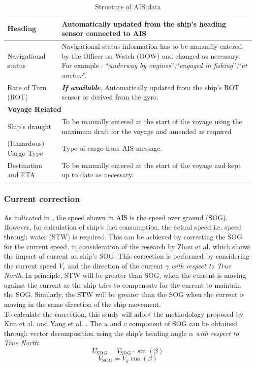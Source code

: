 \begin{table}
{\begin{tabular}{ |p{6cm}|p{9cm}|  }
    \hline
    Heading & Automatically updated from the ship's heading sensor connected to AIS\\
    \hline
    Navigational status & Navigational status information has to be manually entered by the Officer on Watch (OOW) and changed as necessary. For example : ``\emph{underway by engines}'',``\emph{engaged in fishing}'',``\emph{at anchor}''.\\
    \hline
    Rate of Turn (ROT) & \emph{\textbf{If available}}, Automatically updated from the ship's ROT sensor or derived from
    the gyro.\\
    \hline
    \multicolumn{2}{|l|}{\textbf{Voyage Related}}\\
    \hline
    Ship's draught & To be manually entered at the start of the voyage using the
    maximum draft for the voyage and amended as required \\
    \hline 
    (Hazardous) Cargo Type & Type of cargo from AIS message.\\
    \hline
    Destination and ETA & To be manually entered at the start of the voyage and kept up to
    date as necessary.\\
    \hline
    \end{tabular}}
\caption{Structure of AIS data \cite{webimo.2014}}\label{AIS_struct}
\end{table}

\subsubsection{Current correction}\label{curr_corr}

As indicated in , the speed shown in AIS is the speed over ground (SOG). However, for calculation of ship's fuel consumption, the actual speed i.e. speed through water (STW) is required. This can be achieved by correcting the SOG for the current speed, in consideration of the research by Zhou et al. \cite{Zhou.2017} which shows the impact of current on ship's SOG. This correction is performed by considering the current speed $V_c$ and the direction of the current $\gamma$ \emph{with respect to True North}. In principle, STW will be greater than SOG, when the current is moving against the current as the ship tries to compensate for the current to maintain the SOG. Similarly, the STW will be greater than the SOG when the current is moving in the same direction of the ship movement. \\

To calculate the correction, this study will adopt the methodology proposed by Kim et al. \cite{Kim.2020b} and Yang et al. \cite{Yang.2020}. The $u$ and $v$ component of SOG can be obtained through vector decomposition using the ship's heading angle $\alpha$ \emph{with respect to True North}:
\begin{equation}\label{eqvgx}
    U_{\text{SOG}} = V_{\text{SOG}}\cdot\sin(\beta)   
\end{equation}
\begin{equation}\label{eqvgy}
    V_{\text{SOG}} = V_g\cos(\beta)   
\end{equation} 

